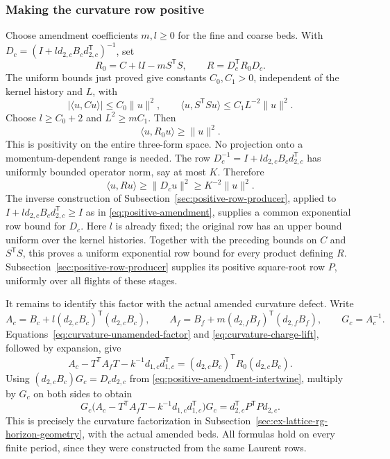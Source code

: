 \subsubsection{Making the curvature row positive}
Choose amendment coefficients $m,l\ge0$ for the fine and
coarse beds. With $D_c=(I+l d_{2,c}B_cd_{2,c}^{\mathsf T})^{-1}$,
set
\[
                R_0=C+lI-mS^{\mathsf T}S,
                       \qquad R=D_c^{\mathsf T}R_0D_c.
\]
The uniform bounds just proved give constants $C_0,C_1>0$,
independent of the kernel history and $L$, with
\[
 |\langle u,Cu\rangle|\le C_0\|u\|^2,
 \qquad
 \langle u,S^{\mathsf T}Su\rangle
                                 \le C_1L^{-2}\|u\|^2.
\]
Choose $l\ge C_0+2$ and $L^2\ge mC_1$. Then
\[
                         \langle u,R_0u\rangle\ge\|u\|^2.
\]
This is positivity on the entire three-form space. No projection
onto a momentum-dependent range is needed. The row
$D_c^{-1}=I+l d_{2,c}B_cd_{2,c}^{\mathsf T}$ has uniformly
bounded operator norm, say at most $K$. Therefore
\[
           \langle u,Ru\rangle\ge\|D_cu\|^2
                                      \ge K^{-2}\|u\|^2.
\]
The inverse construction of Subsection~\ref{sec:positive-row-producer},
applied to $I+l d_{2,c}B_cd_{2,c}^{\mathsf T}\ge I$ as in
\eqref{eq:positive-amendment}, supplies a common exponential row bound
for $D_c$. Here $l$ is already fixed; the original row has an upper
bound uniform over the kernel histories. Together with the preceding bounds on
$C$ and $S^{\mathsf T}S$, this proves a uniform exponential row bound
for every product defining $R$.
Subsection~\ref{sec:positive-row-producer} supplies its positive
square-root row $P$, uniformly over all flights of these stages.

It remains to identify this factor with the actual amended
curvature defect. Write
\[
 A_c=B_c+l(d_{2,c}B_c)^{\mathsf T}(d_{2,c}B_c),\qquad
 A_f=B_f+m(d_{2,f}B_f)^{\mathsf T}(d_{2,f}B_f),
 \qquad G_c=A_c^{-1}.
\]
Equations~\eqref{eq:curvature-unamended-factor} and
\eqref{eq:curvature-charge-lift}, followed by expansion, give
\[
 A_c-T^{\mathsf T}A_fT-k^{-1}d_{1,c}d_{1,c}^{\mathsf T}
           =(d_{2,c}B_c)^{\mathsf T}R_0(d_{2,c}B_c).
\]
Using $(d_{2,c}B_c)G_c=D_cd_{2,c}$ from
\eqref{eq:positive-amendment-intertwine}, multiply by $G_c$
on both sides to obtain
\begin{equation}\label{eq:curvature-paid-factor}
 G_c\bigl(A_c-T^{\mathsf T}A_fT
               -k^{-1}d_{1,c}d_{1,c}^{\mathsf T}\bigr)G_c
                         =d_{2,c}^{\mathsf T}P^{\mathsf T}P d_{2,c}.
\end{equation}
This is precisely the curvature factorization in
Subsection~\ref{sec:ex-lattice-rg-horizon-geometry}, with the actual
amended beds. All formulas hold on every finite period, since
they were constructed from the same Laurent rows.

